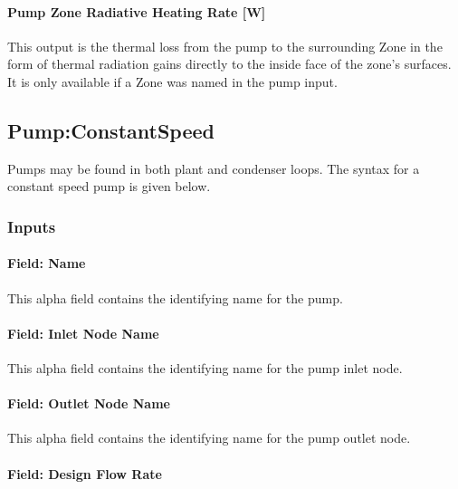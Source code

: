 \paragraph{Pump Zone Radiative Heating Rate {[}W{]}}\label{pump-zone-radiative-heating-rate-w}

This output is the thermal loss from the pump to the surrounding Zone in the form of thermal radiation gains directly to the inside face of the zone's surfaces. It is only available if a Zone was named in the pump input.

\subsection{Pump:ConstantSpeed}\label{pumpconstantspeed}

Pumps may be found in both plant and condenser loops. The syntax for a constant speed pump is given below.

\subsubsection{Inputs}\label{inputs-1-034}

\paragraph{Field: Name}\label{field-name-1-033}

This alpha field contains the identifying name for the pump.

\paragraph{Field: Inlet Node Name}\label{field-inlet-node-name-1-002}

This alpha field contains the identifying name for the pump inlet node.

\paragraph{Field: Outlet Node Name}\label{field-outlet-node-name-1-003}

This alpha field contains the identifying name for the pump outlet node.

\paragraph{Field: Design Flow Rate}\label{field-design-flow-rate-002}

